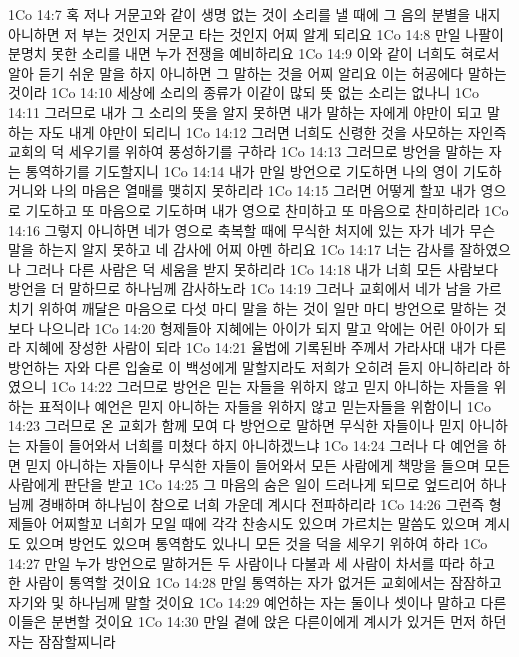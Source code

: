 1Co 14:7  혹 저나 거문고와 같이 생명 없는 것이 소리를 낼 때에 그 음의 분별을 내지 아니하면 저 부는 것인지 거문고 타는 것인지 어찌 알게 되리요
1Co 14:8  만일 나팔이 분명치 못한 소리를 내면 누가 전쟁을 예비하리요
1Co 14:9  이와 같이 너희도 혀로서 알아 듣기 쉬운 말을 하지 아니하면 그 말하는 것을 어찌 알리요 이는 허공에다 말하는 것이라
1Co 14:10  세상에 소리의 종류가 이같이 많되 뜻 없는 소리는 없나니
1Co 14:11  그러므로 내가 그 소리의 뜻을 알지 못하면 내가 말하는 자에게 야만이 되고 말하는 자도 내게 야만이 되리니
1Co 14:12  그러면 너희도 신령한 것을 사모하는 자인즉 교회의 덕 세우기를 위하여 풍성하기를 구하라
1Co 14:13  그러므로 방언을 말하는 자는 통역하기를 기도할지니
1Co 14:14  내가 만일 방언으로 기도하면 나의 영이 기도하거니와 나의 마음은 열매를 맺히지 못하리라
1Co 14:15  그러면 어떻게 할꼬 내가 영으로 기도하고 또 마음으로 기도하며 내가 영으로 찬미하고 또 마음으로 찬미하리라
1Co 14:16  그렇지 아니하면 네가 영으로 축복할 때에 무식한 처지에 있는 자가 네가 무슨 말을 하는지 알지 못하고 네 감사에 어찌 아멘 하리요
1Co 14:17  너는 감사를 잘하였으나 그러나 다른 사람은 덕 세움을 받지 못하리라
1Co 14:18  내가 너희 모든 사람보다 방언을 더 말하므로 하나님께 감사하노라
1Co 14:19  그러나 교회에서 네가 남을 가르치기 위하여 깨달은 마음으로 다섯 마디 말을 하는 것이 일만 마디 방언으로 말하는 것보다 나으니라
1Co 14:20  형제들아 지혜에는 아이가 되지 말고 악에는 어린 아이가 되라 지혜에 장성한 사람이 되라
1Co 14:21  율법에 기록된바 주께서 가라사대 내가 다른 방언하는 자와 다른 입술로 이 백성에게 말할지라도 저희가 오히려 듣지 아니하리라 하였으니
1Co 14:22  그러므로 방언은 믿는 자들을 위하지 않고 믿지 아니하는 자들을 위하는 표적이나 예언은 믿지 아니하는 자들을 위하지 않고 믿는자들을 위함이니
1Co 14:23  그러므로 온 교회가 함께 모여 다 방언으로 말하면 무식한 자들이나 믿지 아니하는 자들이 들어와서 너희를 미쳤다 하지 아니하겠느냐
1Co 14:24  그러나 다 예언을 하면 믿지 아니하는 자들이나 무식한 자들이 들어와서 모든 사람에게 책망을 들으며 모든 사람에게 판단을 받고
1Co 14:25  그 마음의 숨은 일이 드러나게 되므로 엎드리어 하나님께 경배하며 하나님이 참으로 너희 가운데 계시다 전파하리라
1Co 14:26  그런즉 형제들아 어찌할꼬 너희가 모일 때에 각각 찬송시도 있으며 가르치는 말씀도 있으며 계시도 있으며 방언도 있으며 통역함도 있나니 모든 것을 덕을 세우기 위하여 하라
1Co 14:27  만일 누가 방언으로 말하거든 두 사람이나 다불과 세 사람이 차서를 따라 하고 한 사람이 통역할 것이요
1Co 14:28  만일 통역하는 자가 없거든 교회에서는 잠잠하고 자기와 및 하나님께 말할 것이요
1Co 14:29  예언하는 자는 둘이나 셋이나 말하고 다른 이들은 분변할 것이요
1Co 14:30  만일 곁에 앉은 다른이에게 계시가 있거든 먼저 하던 자는 잠잠할찌니라

